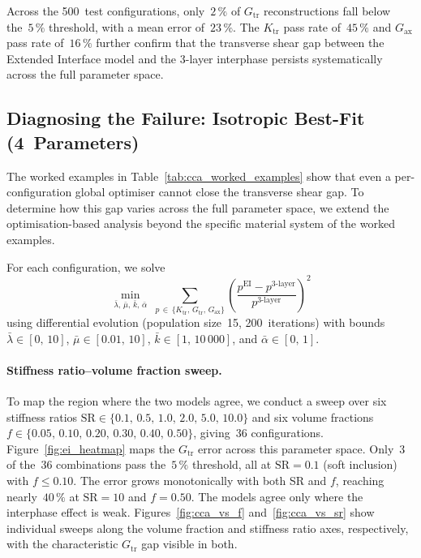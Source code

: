 \documentclass[oneside, 12pt, a4paper, bibliography=totoc]{book}
\begin{document}
Across the 500~test configurations, only~$2\,\%$ of $G_{\text{tr}}$ reconstructions fall below the~$5\,\%$ threshold, with a mean error of~$23\,\%$. The $K_{\text{tr}}$ pass rate of~$45\,\%$ and $G_{\text{ax}}$ pass rate of~$16\,\%$ further confirm that the transverse shear gap between the Extended Interface model and the 3-layer interphase persists systematically across the full parameter space.

\subsection{Diagnosing the Failure: Isotropic Best-Fit (4~Parameters)}
\label{subsec:ei_isotropic}

The worked examples in Table~\ref{tab:cca_worked_examples} show that even a per-configuration global optimiser cannot close the transverse shear gap. To determine how this gap varies across the full parameter space, we extend the optimisation-based analysis beyond the specific material system of the worked examples.

For each configuration, we solve
%
\begin{equation}
    \min_{\bar{\lambda},\, \bar{\mu},\, \bar{k},\, \bar{\alpha}} \;
    \sum_{p \,\in\, \{K_{\text{tr}},\, G_{\text{tr}},\, G_{\text{ax}}\}}
    \left( \frac{p^{\text{EI}} - p^{\text{3-layer}}}{p^{\text{3-layer}}} \right)^{\!2}
    \label{eq:ei_opt}
\end{equation}
%
using differential evolution (population size~15, 200~iterations) with bounds $\bar{\lambda} \in [0,\, 10]$, $\bar{\mu} \in [0.01,\, 10]$, $\bar{k} \in [1,\, 10\,000]$, and $\bar{\alpha} \in [0,\, 1]$.

\paragraph{Stiffness ratio--volume fraction sweep.}
To map the region where the two models agree, we conduct a sweep over six stiffness ratios $\text{SR} \in \{0.1,\, 0.5,\, 1.0,\, 2.0,\, 5.0,\, 10.0\}$ and six volume fractions $f \in \{0.05,\, 0.10,\, 0.20,\, 0.30,\, 0.40,\, 0.50\}$, giving~36 configurations. Figure~\ref{fig:ei_heatmap} maps the $G_{\text{tr}}$ error across this parameter space. Only~3 of the~36 combinations pass the~$5\,\%$ threshold, all at $\text{SR} = 0.1$ (soft inclusion) with $f \leq 0.10$. The error grows monotonically with both SR and $f$, reaching nearly~$40\,\%$ at $\text{SR} = 10$ and $f = 0.50$. The models agree only where the interphase effect is weak. Figures~\ref{fig:cca_vs_f} and~\ref{fig:cca_vs_sr} show individual sweeps along the volume fraction and stiffness ratio axes, respectively, with the characteristic $G_{\text{tr}}$ gap visible in both.
\end{document}
